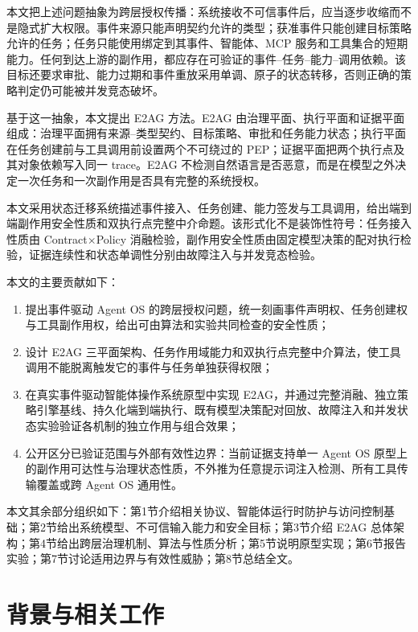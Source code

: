 本文把上述问题抽象为跨层授权传播：系统接收不可信事件后，应当逐步收缩而不是隐式扩大权限。事件来源只能声明契约允许的类型；获准事件只能创建目标策略允许的任务；任务只能使用绑定到其事件、智能体、MCP 服务和工具集合的短期能力。任何到达上游的副作用，都应存在可验证的事件--任务--能力--调用依赖。该目标还要求审批、能力过期和事件重放采用单调、原子的状态转移，否则正确的策略判定仍可能被并发竞态破坏。

基于这一抽象，本文提出 E2AG 方法。E2AG 由治理平面、执行平面和证据平面组成：治理平面拥有来源--类型契约、目标策略、审批和任务能力状态；执行平面在任务创建前与工具调用前设置两个不可绕过的 PEP；证据平面把两个执行点及其对象依赖写入同一 trace。E2AG 不检测自然语言是否恶意，而是在模型之外决定一次任务和一次副作用是否具有完整的系统授权。

本文采用状态迁移系统描述事件接入、任务创建、能力签发与工具调用，给出端到端副作用安全性质和双执行点完整中介命题。该形式化不是装饰性符号：任务接入性质由 Contract$\times$Policy 消融检验，副作用安全性质由固定模型决策的配对执行检验，证据连续性和状态单调性分别由故障注入与并发竞态检验。

本文的主要贡献如下：
\begin{enumerate}
  \item 提出事件驱动 Agent OS 的跨层授权问题，统一刻画事件声明权、任务创建权与工具副作用权，给出可由算法和实验共同检查的安全性质；
  \item 设计 E2AG 三平面架构、任务作用域能力和双执行点完整中介算法，使工具调用不能脱离触发它的事件与任务单独获得权限；
  \item 在真实事件驱动智能体操作系统原型中实现 E2AG，并通过完整消融、独立策略引擎基线、持久化端到端执行、既有模型决策配对回放、故障注入和并发状态实验验证各机制的独立作用与组合效果；
  \item 公开区分已验证范围与外部有效性边界：当前证据支持单一 Agent OS 原型上的副作用可达性与治理状态性质，不外推为任意提示词注入检测、所有工具传输覆盖或跨 Agent OS 通用性。
\end{enumerate}

本文其余部分组织如下：第1节介绍相关协议、智能体运行时防护与访问控制基础；第2节给出系统模型、不可信输入能力和安全目标；第3节介绍 E2AG 总体架构；第4节给出跨层治理机制、算法与性质分析；第5节说明原型实现；第6节报告实验；第7节讨论适用边界与有效性威胁；第8节总结全文。

\section{背景与相关工作}\label{sec:related-v11}

